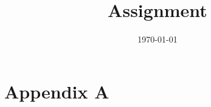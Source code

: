 \documentclass{SelimArticle} %
\title{Assignment}   %
\date{\today}
\begin{document}
\appendix
\thispagestyle{empty}
\section{Appendix A}

\end{document}
